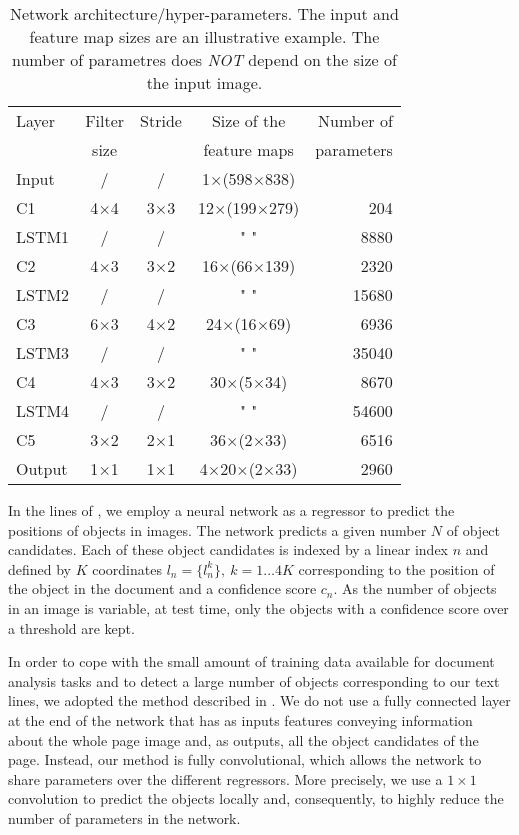 \documentclass[conference]{IEEEtran}
\def\NA{} %
\begin{document}
\begin{table}
\begin{center}
\caption{Network architecture/hyper-parameters. The input and feature map sizes are an illustrative example. The number of parametres does \emph{NOT} depend on the size of the input image.}
\label{tab:architecture}
\begin{tabular}{lcccr}
Layer & Filter  & Stride & Size of the  & Number of  \\ %
      & size    &        & feature maps & parameters \\
\arrayrulecolor{cwblue1} \toprule
Input & / & / & 1$\times$(598$\times$838) & \NA \\
C1  & 4$\times$4 & 3$\times$3 & 12$\times$(199$\times$279) & 204 \\
LSTM1 & / & / & " " & 8880 \\
C2 & 4$\times$3 & 3$\times$2 & 16$\times$(66$\times$139) & 2320 \\
LSTM2 & / & / & " " & 15680 \\
C3 & 6$\times$3 & 4$\times$2 & 24$\times$(16$\times$69) & 6936 \\
LSTM3 & / & / & " " & 35040 \\
C4 & 4$\times$3 & 3$\times$2 & 30$\times$(5$\times$34) & 8670 \\
LSTM4 & / & / & " " & 54600 \\
C5 & 3$\times$2 & 2$\times$1 & 36$\times$(2$\times$33) & 6516 \\
Output & 1$\times$1 & 1$\times$1 & 4$\times$20$\times$(2$\times$33) & 2960 \\
\end{tabular}
\end{center}
\end{table}

In the lines of \cite{erhan2014scalable}, we employ a neural network as a regressor to predict the positions of objects in images. The network predicts a given number $N$ of object candidates. Each of these object candidates is indexed by a linear index $n$ and defined by $K$ coordinates $l_n{=}\{ l^{k}_n \}, \ k{=}{1\dots4K}$ corresponding to the position of the object in the document and a confidence score $c_n$. As the number of objects in an image is variable, at test time, only the objects with a confidence score over a threshold are kept.

In order to cope with the small amount of training data available for   document analysis tasks and to detect a large number of objects corresponding to our text lines, we adopted the method described in \cite{moysset2016learning}. We do not use a fully connected layer at the end of the network that has as inputs features conveying information about the whole page image and, as outputs, all the object candidates of the page. Instead, our method is fully convolutional, which allows the network to share parameters over the different regressors. More precisely, we use a $1{\times}1$ convolution to predict the objects locally and, consequently, to highly reduce the number of parameters in the network.
\end{document}
